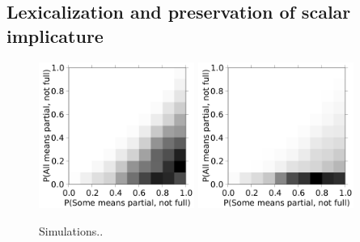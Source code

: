 \documentclass{article} %
\begin{document}
%





\subsection{Lexicalization and preservation of scalar implicature}


\begin{figure}
\centering
\includegraphics[width=2in]{figures/some-all-only-pragmatic.pdf}
\includegraphics[width=2in]{figures/some-all-pragmatic+unambiguous.pdf}
\caption{\label{fig:scalar} Simulations..}
\end{figure}
\end{document}
